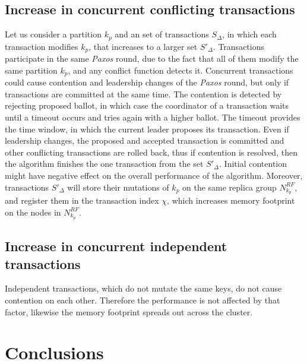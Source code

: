 \documentclass[runningheads,a4paper]{llncs}
\newcommand{\transaction}{$\Delta$\xspace}
\newcommand{\txIndex}{$\chi$\xspace}
\newcommand{\paxos}{\emph{Paxos}\xspace}
\begin{document}
\subsection{Increase in concurrent conflicting transactions}
Let us consider a partition $k_p$ and an set of transactions $S_{\text{\transaction}}$, in which each transaction modifies $k_p$, that increases to a larger set $S'_{\text{\transaction}}$. 
Transactions participate in the same \paxos round, due to the fact that all of them modify the same partition $k_p$, and any conflict function \label{sec:theory:conflictFunctions} detects it.
Concurrent transactions could cause contention and leadership changes of the \paxos round, but only if transactions are committed at the same time. The contention is detected by rejecting proposed ballot, in which case the coordinator of a transaction waits until a timeout occurs and tries again with a higher ballot. The timeout provides the time window, in which the current leader proposes its transaction. Even if leadership changes, the proposed and accepted transaction is committed and other conflicting transactions are rolled back, thus if contention is resolved, then the algorithm finishes the one transaction from the set $S'_{\text{\transaction}}$. Initial contention might have negative effect on the overall performance of the algorithm. Moreover, transactions $S'_{\text{\transaction}}$ will store their mutations of $k_p$ on the same replica group $N^{RF}_{k_p}$, and register them in the transaction index \txIndex, which increases memory footprint on the nodes in $N^{RF}_{k_p}$.

\subsection{Increase in concurrent independent transactions}
Independent transactions, which do not mutate the same keys, do not cause contention on each other. Therefore the performance is not affected by that factor, likewise the memory footprint spreads out across the cluster.

\section{Conclusions}
\end{document}
